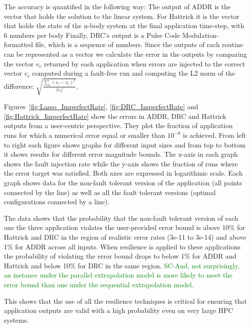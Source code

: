 \documentclass{sig-alternate}
\newcommand{\sui}[1]{%
  \textcolor{green}{SC-#1}
}
\begin{document}
{The accuracy is quantified in the following way:
The output of ADDR is the vector that holds the solution to the linear system.
For Hattrick it is the vector that holds the state of the n-body system at the final application time-step, with 6 numbers per body
Finally, DRC's output is a Pulse Code Modulation-formatted file, which is a sequence of numbers.
Since the outputs of each routine can be represented as a vector we calculate the error in the outputs by comparing the vector $v_e$ returned by each application when errors are injected to the correct vector $v_c$ computed during a fault-free run and computing the L2 norm of the difference: $\sqrt{\frac{\sum_{i} (v_c-v_e)^2}{\left| v_c \right|}}$.

Figures~\ref{fig:Lasso_ImperfectRate}, \ref{fig:DRC_ImperfectRate} and \ref{fig:Hattrick_ImperfectRate} show the errors in ADDR, DRC and Hattrick outputs from a user-centric perspective.
They plot the fraction of application runs for which a numerical error equal or smaller than $10^{-8}$ is achieved.
From left to right each figure shows graphs for different input sizes and from top to bottom it shows results for different error magnitude bounds.
The x-axis in each graph shows the fault injection rate while the y-axis shows the fraction of runs where the error target was satisfied.
Both axes are expressed in logarithmic scale.
Each graph shows data for the non-fault tolerant version of the application (all points connected by the line) as well as all the fault tolerant versions (optimal configurations connected by a line).

The data shows that the probability that the non-fault tolerant version of each one the three application violates the user-provided error bound is above 10\% for Hattrick and DRC in the region of realistic error rates (3e-11 to 3e-14) and above 1\% for ADDR across all inputs.
When resilience is applied to these applications the probability of violating the error bound drops to below 1\% for ADDR and Hattrick and below 10\% for DRC in the same region.
\sui{And, not surprisingly, an instance under the parallel extrapolation model is more likely to meet the error bound than one under the sequential extrapolation model.}
This shows that the use of all the resilience techniques is critical for ensuring that application outputs are valid with a high probability even on very large HPC systems.


}
\end{document}
